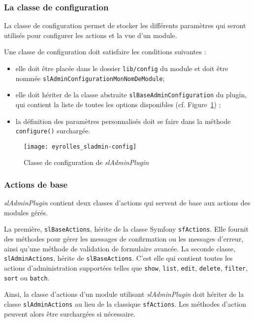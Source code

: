 \subsubsection{La classe de configuration}

La classe de configuration permet de stocker les différents paramètres qui seront utilisés pour configurer les actions et la vue d'un module.

Une classe de configuration doit satisfaire les conditions suivantes :
\begin{itemize}
\item elle doit être placée dans le dossier \texttt{lib/config} du module et doit être nommée \texttt{slAdminConfigurationMonNomDeModule};
\item elle doit hériter de la classe abstraite \texttt{slBaseAdminConfiguration} du plugin, qui contient la liste de toutes les options disponibles (cf. Figure~\ref{figure:eyrolles_sladmin-config}) ;
\item la définition des paramètres personnalisés doit se faire dans la méthode \texttt{configure()} surchargée.
\end{itemize}

\begin{figure}
	\centering
	\texttt{[image: eyrolles\_sladmin-config]}
	\caption{Classe de configuration de \textit{slAdminPlugin}}
	\label{figure:eyrolles_sladmin-config}
\end{figure}

\subsubsection{Actions de base}

\textit{slAdminPlugin} contient deux classes d'actions qui servent de base aux actions des modules gérés.

La première, \texttt{slBaseActions}, hérite de la classe Symfony \texttt{sfActions}. Elle fournit des méthodes pour gérer les messages de confirmation ou les messages d'erreur, ainsi qu'une méthode de validation de formulaire avancée. La seconde classe, \texttt{slAdminActions}, hérite de \texttt{slBaseActions}. C'est elle qui contient toutes les actions d'administration supportées telles que \texttt{show}, \texttt{list}, \texttt{edit}, \texttt{delete}, \texttt{filter}, \texttt{sort} ou \texttt{batch}.

Ainsi, la classe d'actions d'un module utilisant \textit{slAdminPlugin} doit hériter de la classe \texttt{slAdminActions} au lieu de la classique \texttt{sfActions}. Les méthodes d'action peuvent alors être surchargées si nécessaire.

